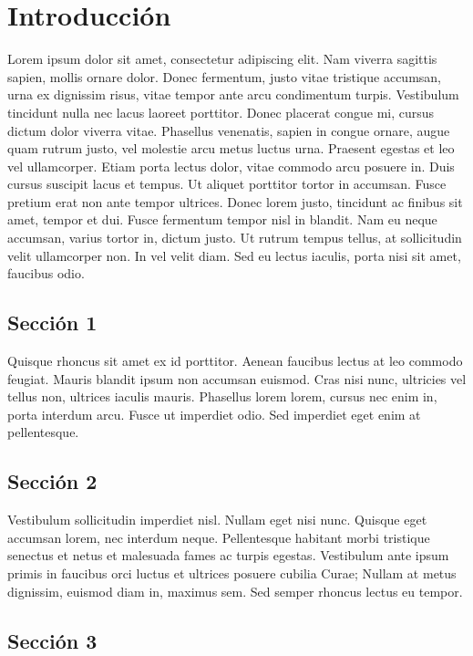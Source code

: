 \chapter{Introducción}

Lorem ipsum dolor sit amet, consectetur adipiscing elit. Nam viverra sagittis sapien, mollis ornare dolor. Donec fermentum, justo vitae tristique accumsan, urna ex dignissim risus, vitae tempor ante arcu condimentum turpis. Vestibulum tincidunt nulla nec lacus laoreet porttitor. Donec placerat congue mi, cursus dictum dolor viverra vitae. Phasellus venenatis, sapien in congue ornare, augue quam rutrum justo, vel molestie arcu metus luctus urna. Praesent egestas et leo vel ullamcorper. Etiam porta lectus dolor, vitae commodo arcu posuere in. Duis cursus suscipit lacus et tempus. Ut aliquet porttitor tortor in accumsan. Fusce pretium erat non ante tempor ultrices. Donec lorem justo, tincidunt ac finibus sit amet, tempor et dui. Fusce fermentum tempor nisl in blandit. Nam eu neque accumsan, varius tortor in, dictum justo. Ut rutrum tempus tellus, at sollicitudin velit ullamcorper non. In vel velit diam. Sed eu lectus iaculis, porta nisi sit amet, faucibus odio.

	\section{Sección 1}
	
	Quisque rhoncus sit amet ex id porttitor. Aenean faucibus lectus at leo commodo feugiat. Mauris blandit ipsum non accumsan euismod. Cras nisi nunc, ultricies vel tellus non, ultrices iaculis mauris. Phasellus lorem lorem, cursus nec enim in, porta interdum arcu. Fusce ut imperdiet odio. Sed imperdiet eget enim at pellentesque.
	
	\section{Sección 2}
	
	Vestibulum sollicitudin imperdiet nisl. Nullam eget nisi nunc. Quisque eget accumsan lorem, nec interdum neque. Pellentesque habitant morbi tristique senectus et netus et malesuada fames ac turpis egestas. Vestibulum ante ipsum primis in faucibus orci luctus et ultrices posuere cubilia Curae; Nullam at metus dignissim, euismod diam in, maximus sem. Sed semper rhoncus lectus eu tempor.
	
	\section{Sección 3}
	
